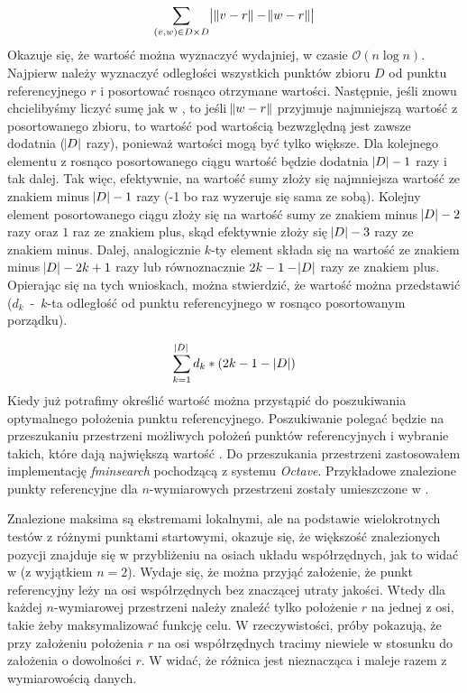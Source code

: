 \begin{equation}
	\sum_{(v,w) \in D \times D}\abs{\,\norm{v-r} - \norm{w-r}}
	\label{ti:cartesian-sum}
\end{equation}
Okazuje się, że wartość  można wyznaczyć wydajniej, w czasie $ \mathcal{O}(n\log{n}) $. Najpierw należy wyznaczyć odległości wszystkich punktów zbioru $ D $ od punktu referencyjnego $ r $ i posortować rosnąco otrzymane wartości. Następnie, jeśli znowu chcielibyśmy liczyć sumę jak w , to jeśli $ \norm{w-r} $ przyjmuje najmniejszą wartość z posortowanego zbioru, to wartość pod wartością bezwzględną jest zawsze dodatnia ($ \abs{D} $ razy), ponieważ wartości  mogą być tylko większe. Dla kolejnego elementu z rosnąco posortowanego ciągu wartość będzie dodatnia $ \abs{D}-1 $ razy i tak dalej. Tak więc, efektywnie, na wartość sumy złoży się najmniejsza wartość ze znakiem minus $ \abs{D}-1 $ razy (-1 bo raz wyzeruje się sama ze sobą). Kolejny element posortowanego ciągu złoży się na wartość sumy ze znakiem minus $ \abs{D}-2 $ razy oraz $ 1 $ raz ze znakiem plus, skąd efektywnie złoży się $ \abs{D}-3 $ razy ze znakiem minus. Dalej, analogicznie $ k $-ty element składa się na wartość  ze znakiem minus $ \abs{D} - 2k + 1 $ razy lub równoznacznie $ 2k-1-\abs{D} $ razy ze znakiem plus. Opierając się na tych wnioskach, można stwierdzić, że wartość  można przedstawić  (\mbox{$ d_k $ - $ k $-ta} odległość od punktu referencyjnego w rosnąco posortowanym porządku).

\begin{equation}
	\sum_{k=1}^{\abs{D}}d_k*(2k-1-|D|)
	\label{ti:eff-max-ti-d}
\end{equation}
Kiedy już potrafimy określić wartość  można przystąpić do poszukiwania optymalnego położenia punktu referencyjnego. Poszukiwanie polegać będzie na przeszukaniu przestrzeni możliwych położeń punktów referencyjnych i wybranie takich, które dają największą wartość . Do przeszukania przestrzeni zastosowałem implementację \textit{fminsearch} pochodzącą z systemu \textit{Octave}. Przykładowe znalezione punkty referencyjne dla $ n $-wymiarowych przestrzeni zostały umieszczone w .

Znalezione maksima są ekstremami lokalnymi, ale na podstawie wielokrotnych testów z różnymi punktami startowymi, okazuje się, że większość znalezionych pozycji znajduje się w przybliżeniu na osiach układu współrzędnych, jak to widać w  (z wyjątkiem $ n=2 $). Wydaje się, że można przyjąć założenie, że punkt referencyjny leży na osi współrzędnych bez znaczącej utraty jakości. Wtedy dla każdej $ n $-wymiarowej przestrzeni należy znaleźć tylko położenie $ r $ na jednej z osi, takie żeby maksymalizować funkcję celu. W rzeczywistości, próby pokazują, że przy założeniu położenia $ r $ na osi współrzędnych tracimy niewiele w stosunku do założenia o dowolności $ r $. W  widać, że różnica jest nieznacząca i maleje razem z wymiarowością danych.

